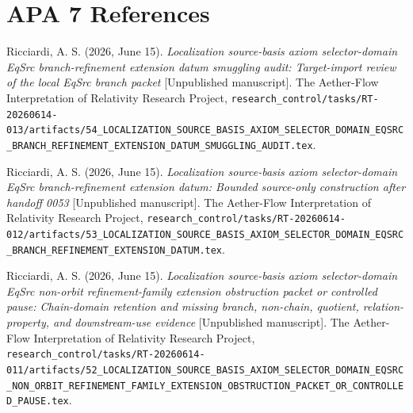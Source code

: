 \documentclass[11pt]{article}
\begin{document}
\section*{APA 7 References}

Ricciardi, A. S. (2026, June 15). \emph{Localization source-basis axiom
selector-domain EqSrc branch-refinement extension datum smuggling audit:
Target-import review of the local EqSrc branch packet} [Unpublished
manuscript]. The Aether-Flow Interpretation of Relativity Research
Project,
\texttt{research\_control/tasks/RT-20260614-013/artifacts/54\_LOCALIZATION\_SOURCE\_BASIS\_AXIOM\_SELECTOR\_DOMAIN\_EQSRC\_BRANCH\_REFINEMENT\_EXTENSION\_DATUM\_SMUGGLING\_AUDIT.tex}.

Ricciardi, A. S. (2026, June 15). \emph{Localization source-basis axiom
selector-domain EqSrc branch-refinement extension datum: Bounded
source-only construction after handoff 0053} [Unpublished manuscript].
The Aether-Flow Interpretation of Relativity Research Project,
\texttt{research\_control/tasks/RT-20260614-012/artifacts/53\_LOCALIZATION\_SOURCE\_BASIS\_AXIOM\_SELECTOR\_DOMAIN\_EQSRC\_BRANCH\_REFINEMENT\_EXTENSION\_DATUM.tex}.

Ricciardi, A. S. (2026, June 15). \emph{Localization source-basis axiom
selector-domain EqSrc non-orbit refinement-family extension obstruction
packet or controlled pause: Chain-domain retention and missing branch,
non-chain, quotient, relation-property, and downstream-use evidence}
[Unpublished manuscript]. The Aether-Flow Interpretation of Relativity
Research Project,
\texttt{research\_control/tasks/RT-20260614-011/artifacts/52\_LOCALIZATION\_SOURCE\_BASIS\_AXIOM\_SELECTOR\_DOMAIN\_EQSRC\_NON\_ORBIT\_REFINEMENT\_FAMILY\_EXTENSION\_OBSTRUCTION\_PACKET\_OR\_CONTROLLED\_PAUSE.tex}.
\end{document}
